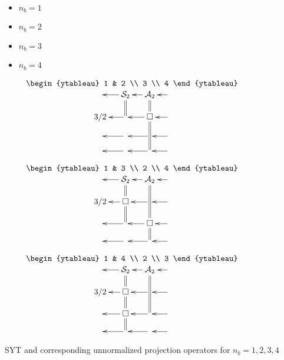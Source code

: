 \newcommand{\YTttwo}[0]{
$
\bcen
\text{
\begin{ytableau}
1 & 2
\\
3
\\
4
\end{ytableau}
}
\\
\xymatrix@R=1pc@C=1pc{
&\ar[l]\ar@2{-}[d]\cals_2
&\ar[l]\ar@2{-}[d]\cala_2
&\ar[l]
\\ 3/2
&\ar[l]
&\ar[l]\square \ar@2{-}[dd]
&\ar[l]
\\
&\ar[l]
&\ar[l]
&\ar[l]
\\
&\ar[l]&\ar[l]&\ar[l]
}\ecen
$
}

\newcommand{\YTtthree}[0]{
$
\bcen
\text{
\begin{ytableau}
1 & 3
\\
2
\\
4
\end{ytableau}
}
\\
\xymatrix@R=1pc@C=1pc{
&\ar[l]\ar@2{-}[d]\cals_2
&\ar[l]\ar@2{-}[dd]\cala_2
&\ar[l]
\\ 3/2
&\ar[l]\square \ar@2{-}[d]
&\ar[l]
&\ar[l]
\\
&\ar[l]
&\ar[l]\square \ar@2{-}[d]
&\ar[l]
\\
&\ar[l]&\ar[l]&\ar[l]
}\ecen
$
}

\newcommand{\YTtfour}[0]{
$
\bcen
\text{
\begin{ytableau}
1 & 4
\\
2
\\
3
\end{ytableau}
}
\\
\xymatrix@R=1pc@C=1pc{
&\ar[l]\ar@2{-}[d]\cals_2
&\ar[l]\ar@2{-}[dd]\cala_2
&\ar[l]
\\ 3/2
&\ar[l]\square \ar@2{-}[d]
&\ar[l]
&\ar[l]
\\
&\ar[l]\square \ar@2{-}[d]
&\ar[l]
&\ar[l]
\\
&\ar[l]&\ar[l]&\ar[l]
}\ecen
$
}



\begin{itemize}

\item $n_b=1$

\YTone

\item $n_b=2$

\YTs
\YTa

\item  $n_b=3$

\YTss

\YTsa
\quad\YTas

\YTaa

\item $n_b=4$

\YTsss

\YTsFour
\quad\YTsaFour
\quad\YTasFour

\YTsquare
\quad\YTsquareP

\YTttwo
\quad\YTtthree
\quad\YTtfour

\YTaaa
\end{itemize}
SYT
and corresponding unnormalized projection operators for $n_b=1, 2,3,4$

